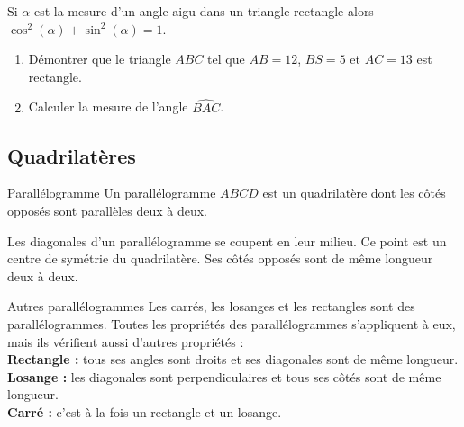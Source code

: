 \documentclass[11pt]{article}
\begin{document}
\begin{prop}
  Si $\alpha$ est la mesure d'un angle aigu dans un triangle rectangle alors
  $\cos^2(\alpha)+\sin^2(\alpha)=1$.
\end{prop}

\begin{app}
  \begin{enumerate}
    \item Démontrer que le triangle $ABC$ tel que $AB=12$, $BS=5$ et $AC=13$ est
      rectangle.
    \item Calculer la mesure de l'angle $\widehat{BAC}$.
  \end{enumerate}
\end{app}

\subsection{Quadrilatères}
\noindent\begin{minipage}{.5\textwidth}
  \begin{defi}{Parallélogramme}
    Un parallélogramme $ABCD$ est un quadrilatère dont les côtés opposés sont
    parallèles deux à deux.
  \end{defi}
  \begin{prop}
    Les diagonales d'un parallélogramme se coupent en leur milieu. Ce point est
    un centre de symétrie du quadrilatère. Ses côtés opposés sont de même
    longueur deux à deux.
  \end{prop}
  \begin{defi}{Autres parallélogrammes}
    Les carrés, les losanges et les rectangles sont des parallélogrammes. Toutes
    les propriétés des parallélogrammes s'appliquent à eux, mais ils vérifient
    aussi d'autres propriétés :\\
    \textbf{Rectangle :} tous ses angles sont droits et ses diagonales sont de
    même longueur.\\
    \textbf{Losange :} les diagonales sont perpendiculaires et tous ses côtés
    sont de même longueur.\\
    \textbf{Carré :} c'est à la fois un rectangle et un losange.
  \end{defi}
\end{minipage}
\end{document}
